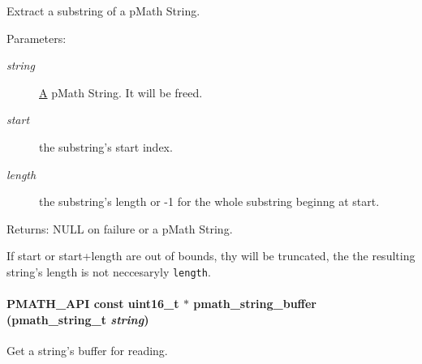 Extract a substring of a pMath String. 

\begin{Desc}
\item[Parameters:]
\begin{description}
\item[{\em string}]\hyperlink{class_a}{A} pMath String. It will be freed. \item[{\em start}]the substring's start index. \item[{\em length}]the substring's length or -1 for the whole substring beginng at start. \end{description}
\end{Desc}
\begin{Desc}
\item[Returns:]NULL on failure or a pMath String.\end{Desc}
If start or start+length are out of bounds, thy will be truncated, the the resulting string's length is not neccesaryly {\tt length}. \hypertarget{group__strings_g381c6abdb25ce421c93c72aa51f33c29}{
\paragraph[{pmath\_\-string\_\-buffer}]{\setlength{\rightskip}{0pt plus 5cm}PMATH\_\-API const uint16\_\-t $\ast$ pmath\_\-string\_\-buffer ({\bf pmath\_\-string\_\-t} {\em string})}\hfill}
\label{group__strings_g381c6abdb25ce421c93c72aa51f33c29}


Get a string's buffer for reading. 

